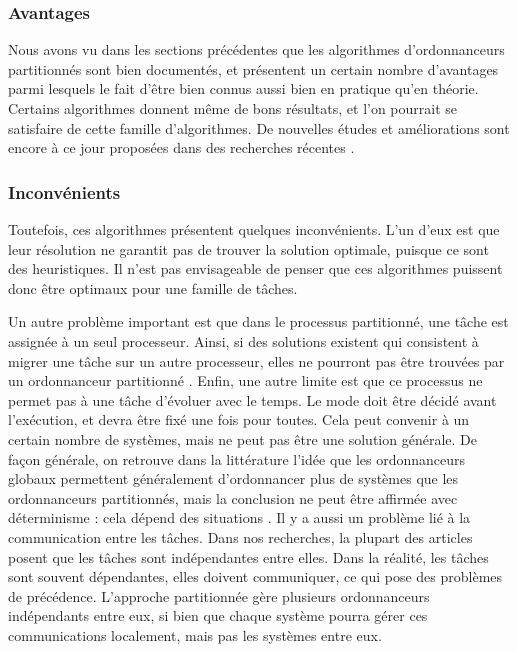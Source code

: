 \documentclass[11pt,a4paper,oneside]{report}
\begin{document}
\subsubsection{Avantages}
Nous avons vu dans les sections précédentes que les algorithmes d'ordonnanceurs 
partitionnés sont bien documentés, et présentent un certain nombre d'avantages parmi lesquels 
le fait d'être bien connus aussi bien en pratique qu'en théorie. 
Certains algorithmes donnent même de bons résultats, et l'on pourrait se satisfaire de 
cette famille d'algorithmes. De nouvelles études et améliorations sont encore à ce jour proposées 
dans des recherches récentes \cite{rodriguez_paul_multi-criteria_2013}.\\

\subsubsection{Inconvénients}
Toutefois, ces algorithmes présentent quelques inconvénients. 
L'un d'eux est que leur résolution ne garantit pas de trouver la solution optimale, 
puisque ce sont des heuristiques. 
Il n'est pas envisageable de penser 
que ces algorithmes puissent donc être optimaux pour une famille de tâches.

Un autre problème important est que dans le processus partitionné, une tâche est 
assignée à un seul processeur. 
Ainsi, si des solutions existent qui consistent à migrer une tâche sur un autre processeur, 
elles ne pourront pas être trouvées 
par un ordonnanceur partitionné \cite{ramamurthy_static-priority_2000}. 
Enfin, une autre limite est que ce processus ne permet pas à une tâche d'évoluer avec le temps. 
Le mode doit être décidé avant l'exécution, et devra être fixé une fois pour toutes. 
Cela peut convenir à un certain nombre de systèmes, mais ne peut pas être une solution générale.
De façon générale, on retrouve dans la littérature l'idée que les ordonnanceurs globaux 
permettent généralement d'ordonnancer plus de systèmes que les ordonnanceurs partitionnés, 
mais la conclusion ne peut être affirmée avec déterminisme : cela dépend des situations
\cite{lopez_utilization_2004}.
Il y a aussi un problème lié à la communication entre les tâches. Dans nos recherches, 
la plupart des articles posent que les tâches sont indépendantes entre elles. Dans 
la réalité, les tâches sont souvent dépendantes, elles doivent communiquer, ce qui pose 
des problèmes de précédence. 
L'approche partitionnée gère plusieurs ordonnanceurs indépendants entre eux, si bien 
que chaque système pourra gérer ces communications localement, mais pas les systèmes entre eux. 
\\
\end{document}

